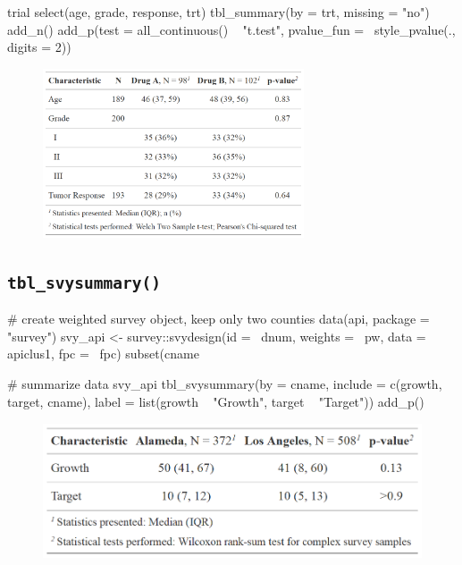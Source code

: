 
\begin{example}
trial %
  select(age, grade, response, trt) %
  tbl_summary(by = trt, missing = "no") %
  add_n() %
  add_p(test = all_continuous() ~ "t.test",
        pvalue_fun = ~style_pvalue(., digits = 2))

\end{example}
\begin{figure}[h!]
  \includegraphics[height=5cm]{summary_plus_plus.png}
  \centering
\end{figure}

\subsection{\texorpdfstring{\texttt{tbl\_svysummary()}}{tbl\_svysummary()}}

\begin{example}
# create weighted survey object, keep only two counties
data(api, package = "survey")
svy_api <- 
  survey::svydesign(id = ~dnum, weights = ~pw, data = apiclus1, fpc = ~fpc) %
  subset(cname %

# summarize data
svy_api %
  tbl_svysummary(by = cname, 
                 include = c(growth, target, cname),
                 label = list(growth ~ "Growth",
                              target ~ "Target")) %
  add_p()
\end{example}
\begin{figure}[h!]
  \includegraphics[height=4cm]{svysummary.png}
  \centering
\end{figure}

